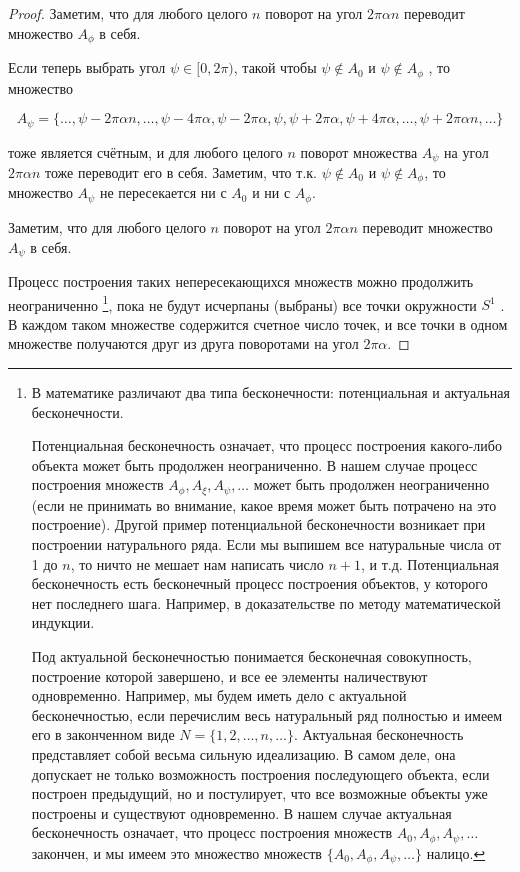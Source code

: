 \begin{proof}
Заметим, что для любого целого $n$ поворот на
угол $2\pi\alpha n$ переводит множество $A_\phi$ в себя.

Если теперь выбрать угол $\psi \in [0, 2\pi)$, такой чтобы $\psi \notin A_0$ и $\psi \notin A_\phi$ , то множество

\begin{equation*}
	A_\psi = \{\ldots , \psi - 2\pi\alpha n, \ldots , \psi - 4\pi\alpha, \psi - 2\pi\alpha, \psi, \psi + 2\pi\alpha, \psi + 4\pi\alpha, \ldots , \psi + 2\pi\alpha n, \ldots \}
\end{equation*}

тоже является счётным, и для любого целого $n$ поворот множества $A_\psi$ на угол $2\pi\alpha n$ тоже переводит его в себя. Заметим, что т.к. $\psi \notin A_0$ и $\psi \notin A_\phi$, то
множество $A_\psi$ не пересекается ни с $A_0$ и ни с $A_\phi$. 

Заметим, что для любого целого $n$ поворот на угол $2\pi\alpha n$ переводит множество $A_\psi$ в себя.

Процесс построения таких непересекающихся множеств можно продолжить неограниченно
\footnote{
	В математике различают два типа бесконечности: потенциальная и актуальная бесконечности.

	Потенциальная бесконечность означает, что процесс построения какого-либо объекта может быть продолжен неограниченно. В нашем случае процесс построения множеств $A_\phi , A_\xi , A_\psi , \ldots$ может быть продолжен неограниченно (если не принимать во внимание, какое время может быть потрачено на это построение).
	Другой пример потенциальной бесконечности возникает при построении натурального ряда.
	Если мы выпишем все натуральные числа от 1 до $n$, то ничто не мешает нам написать число $n+1$, и т.д.
	Потенциальная бесконечность есть бесконечный процесс построения объектов, у которого нет последнего шага. Например, в доказательстве по методу математической индукции.

	Под актуальной бесконечностью понимается бесконечная совокупность, построение которой завершено, и все ее элементы наличествуют одновременно. Например, мы будем иметь дело с актуальной бесконечностью, если перечислим весь натуральный ряд полностью и имеем его в законченном виде
	$N = \{1, 2, \ldots , n, \ldots \}$. Актуальная бесконечность представляет собой весьма сильную идеализацию. В
	самом деле, она допускает не только возможность построения последующего объекта, если построен
	предыдущий, но и постулирует, что все возможные объекты уже построены и существуют одновременно.
	В нашем случае актуальная бесконечность означает, что процесс построения множеств $A_0, A_\phi, A_\psi , \ldots$
	закончен, и мы имеем это множество множеств $\{A_0, A_\phi, A_\psi , \ldots\}$ налицо.
}, пока не будут исчерпаны (выбраны) все точки окружности $S^1$ . В каждом таком множестве содержится счетное число точек, и все точки в одном множестве получаются друг из друга поворотами на угол $2\pi\alpha$.


\end{proof}
